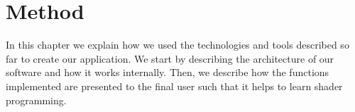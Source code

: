 \chapter{Method}
In this chapter we explain how we used the technologies and tools described so far to create our application. We start by describing the architecture of our software and how it works internally. Then, we describe how the functions implemented are presented to the final user such that it helps to learn shader programming.




